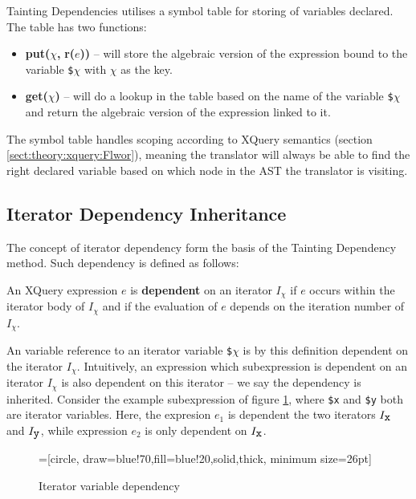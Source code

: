 Tainting Dependencies utilises a symbol table for storing of variables declared. The table has two functions:
\begin{itemize}
  \item \textbf{put(}$\chi$\textbf{, }\textbf{r(}$e$\textbf{))} -- will store the
  algebraic version of the expression bound to the variable \texttt{\$}$\chi$ with $\chi$ as the key.  
  \item \textbf{get(}$\chi$\textbf{)} -- will do a lookup in the table based on the name of the variable
  \texttt{\$}$\chi$ and return the algebraic version of the expression linked to it.
\end{itemize}
The symbol table handles scoping according to XQuery semantics (section \ref{sect:theory:xquery:Flwor}), meaning
the translator will always be able to find the right declared variable based on which node in the AST the
translator is visiting.

\subsection{Iterator Dependency Inheritance}
\label{sect:trans:TD:dependency}

The concept of iterator dependency form the basis of the Tainting Dependency method. Such dependency is
defined as follows:

\noindent
\begin{myDefinition}
An XQuery expression $e$ is \textbf{dependent} on an iterator $I_{\chi}$ if $e$
occurs within the iterator body of $I_{\chi}$ and if the evaluation of $e$ depends on the iteration number of $I_{\chi}$.
\label{def:iterVarDep}
\end{myDefinition}

An variable reference to an iterator variable \texttt{\$}$\chi$ is by this definition dependent on the iterator
$I_{\chi}$. Intuitively, an expression which subexpression is dependent on an iterator $I_{\chi}$ is also
dependent on this iterator -- we say the dependency is inherited. Consider the example subexpression of figure
\ref{fig:trans:td:varDep}, where \texttt{\$x} and \texttt{\$y} both are iterator variables. Here, the expresion
$e_{1}$ is dependent the two iterators $I_{\mbox{\texttt{x}}}$ and $I_{\mbox{\texttt{y}}}$, while expression
$e_{2}$ is only dependent on $I_{\mbox{\texttt{x}}}$.

\begin{figure}[h]
\centering
{}=[circle, draw=blue!70,fill=blue!20,solid,thick, minimum
size=26pt]
\label{fig:trans:td:varDep}
\caption[Iterator variable dependency]{Iterator variable dependency}
\end{figure}

